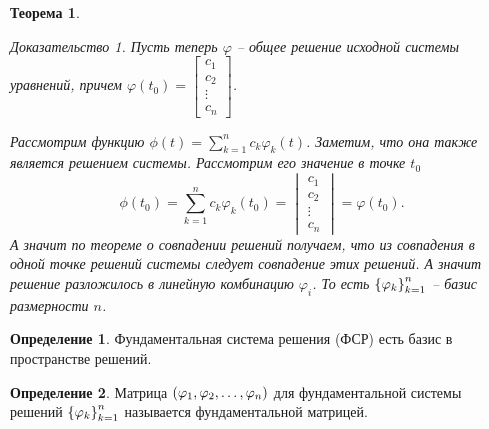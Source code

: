 \documentclass[a5paper, 10pt]{article}
\theoremstyle{definition}
\newtheorem{Def}{Определение}
\theoremstyle{plain}
\newtheorem{Th}{Теорема}
\theoremstyle{remark}
\newtheorem*{Proof}{Доказательство}
\begin{document}
\begin{Th}
\begin{Proof}
			Пусть теперь $\varphi$ -- общее решение исходной системы уравнений, причем $\varphi(t_0) = \begin{bmatrix}
				c_1\\c_2\\\vdots\\c_n
			\end{bmatrix}
			$.
			
			Рассмотрим функцию $\phi(t) = \sum\limits_{k=1}^n c_k \varphi_k(t)$. Заметим, что она также является решением системы. Рассмотрим его значение в точке $t_0$
			\[
			\phi(t_0) = \sum\limits_{k=1}^n c_k \varphi_k(t_0) = \begin{vmatrix}
				c_1\\c_2\\\vdots\\c_n
			\end{vmatrix} = \varphi(t_0).
			\]
			А значит по теореме о совпадении решений получаем, что из совпадения в одной точке решений системы следует совпадение этих решений. А значит решение разложилось в линейную комбинацию $\varphi_i$. То есть $\left\{\varphi_k\right\}_{k=1}^n$ -- базис размерности $n$.
		\end{Proof}
	\end{Th}
	\begin{Def}
		Фундаментальная система решения (ФСР) есть базис в пространстве решений.
	\end{Def}
	\begin{Def}
		Матрица $\left(\varphi_1, \varphi_2, \dots, \varphi_n\right)$ для фундаментальной системы решений $\left\{\varphi_k\right\}_{k=1}^n$ называется фундаментальной матрицей.
	\end{Def}
\end{document}

